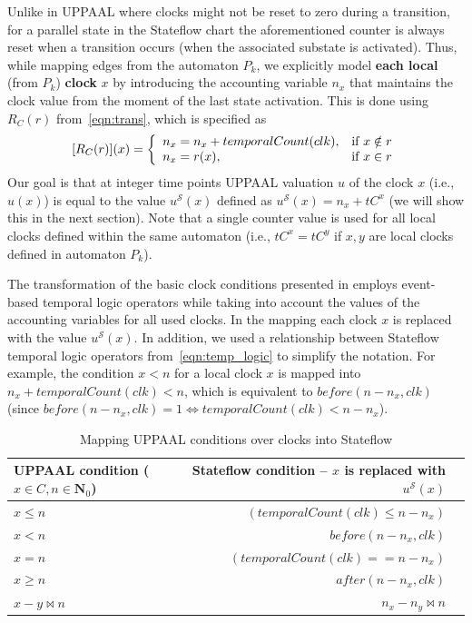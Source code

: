 Unlike in UPPAAL where clocks might not be reset to zero during a transition, for a parallel state in the Stateflow chart the aforementioned counter is always reset when a transition occurs (when the associated substate is activated). Thus, while mapping edges from the automaton $P_k$, we explicitly model \textbf{each local} (from $P_k$) \textbf{clock} $x$ by introducing the accounting variable $n_x$ that maintains the clock value from the moment of the last state activation. This is done using $R_{C}(r)$ from~\eqref{eqn:trans}, which is specified as
\begin{equation}
\label{eqn:lclock_res}
[R_{C}(r)](x) = \left\{
\begin{array}{lr} 
n_x=n_x+temporalCount(clk), & \hbox{if } x\notin r\\
n_x = r(x),& \hbox{if } x\in r
\end{array}
\right.
\end{equation}
Our goal is that at integer time points UPPAAL valuation $u$ of the clock $x$ (i.e.,~$u(x)$) is equal to the value 
$u^\mathcal{S}(x)$ defined as 
$
\label{eqn:us_def}
u^\mathcal{S}(x)=n_x+tC^x
$ 
(we will show this in the next section). Note that a single counter value is used for all local clocks defined within the same automaton (i.e., $tC^x=tC^y$ if $x,y$ are local clocks defined in automaton $P_k$). 


The transformation of the basic clock conditions presented in  employs event-based temporal logic operators while taking into account the values of the accounting variables for all used clocks. In the mapping each clock $x$ is replaced with the value $u^\mathcal{S}(x)$. In addition, we used a relationship between Stateflow temporal logic operators from~\eqref{eqn:temp_logic} to simplify the notation. For example, the condition $x<n$ for a local clock $x$ is mapped into $n_x+temporalCount(clk)<n$, which is equivalent to $before(n-n_x,clk)$ (since $before(n-n_x,clk)=1\Leftrightarrow temporalCount(clk)< n-n_x$).


\begin{table}[!t]
{
\centering
\begin{tabular}{|l|r|r|}
\hline
UPPAAL condition ($x\in C,n\in \mathbf{N}_0$) & Stateflow condition --  $x$ is replaced with $u^\mathcal{S}(x)$ \\
\hline
$x\leq n$ &  $(temporalCount(clk)\leq n-n_x)$ \\
$x< n$  & $before(n-n_x,clk)$ \\
$x= n$   & $(temporalCount(clk)==n-n_x)$ \\
$x\geq n$  & $after(n-n_x,clk)$ \\
$x-y\bowtie n$  & $n_x-n_y\bowtie n$  \\
\hline
\end{tabular}
}
\caption{Mapping UPPAAL conditions over clocks into Stateflow}
\label{tab:UP2SF_clocks}
\end{table}



